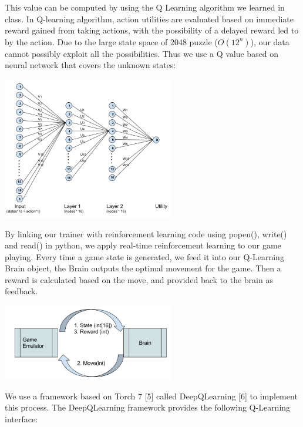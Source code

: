 \documentclass[9pt,twocolumn]{article}
\begin{document}
This value can be computed by using the Q Learning algorithm we learned in class. In Q-learning algorithm, action utilities are evaluated based on immediate reward gained from taking actions, with the possibility of a delayed reward led to by the action. Due to the large state space of 2048 puzzle ($O(12^n)$), our data cannot possibly exploit all the possibilities. Thus we use a Q value based on neural network that covers the unknown states:

\begin{centering}

\includegraphics[width=75mm]{rl_nodes.png}

\end{centering}

By linking our trainer with reinforcement learning code using popen(), write() and read() in python, we apply real-time reinforcement learning to our game playing. Every time a game state is generated, we feed it into our Q-Learning Brain object, the Brain outputs the optimal movement for the game. Then a reward is calculated based on the move, and provided back to the brain as feedback.

\begin{centering}

\includegraphics[width=75mm]{rl_state.png}

\end{centering}

We use a framework based on Torch 7 [5] called DeepQLearning [6] to implement this process. The DeepQLearning framework provides the following Q-Learning interface:
\end{document}
